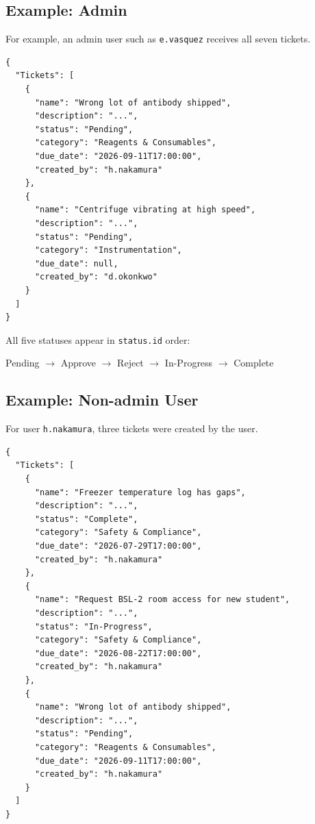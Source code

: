 \documentclass[11pt,a4paper]{article}
\begin{document}
\subsection{Example: Admin}

For example, an admin user such as
\texttt{e.vasquez} receives all seven tickets.

\begin{lstlisting}[style=json]
{
  "Tickets": [
    {
      "name": "Wrong lot of antibody shipped",
      "description": "...",
      "status": "Pending",
      "category": "Reagents & Consumables",
      "due_date": "2026-09-11T17:00:00",
      "created_by": "h.nakamura"
    },
    {
      "name": "Centrifuge vibrating at high speed",
      "description": "...",
      "status": "Pending",
      "category": "Instrumentation",
      "due_date": null,
      "created_by": "d.okonkwo"
    }
  ]
}
\end{lstlisting}

All five statuses appear in \texttt{status.id} order:

\begin{center}
Pending $\rightarrow$
Approve $\rightarrow$
Reject $\rightarrow$
In-Progress $\rightarrow$
Complete
\end{center}

\newpage
\subsection{Example: Non-admin User}

For user \texttt{h.nakamura}, three tickets were created by
the user.

\begin{lstlisting}[style=json]
{
  "Tickets": [
    {
      "name": "Freezer temperature log has gaps",
      "description": "...",
      "status": "Complete",
      "category": "Safety & Compliance",
      "due_date": "2026-07-29T17:00:00",
      "created_by": "h.nakamura"
    },
    {
      "name": "Request BSL-2 room access for new student",
      "description": "...",
      "status": "In-Progress",
      "category": "Safety & Compliance",
      "due_date": "2026-08-22T17:00:00",
      "created_by": "h.nakamura"
    },
    {
      "name": "Wrong lot of antibody shipped",
      "description": "...",
      "status": "Pending",
      "category": "Reagents & Consumables",
      "due_date": "2026-09-11T17:00:00",
      "created_by": "h.nakamura"
    }
  ]
}
\end{lstlisting}
\end{document}
